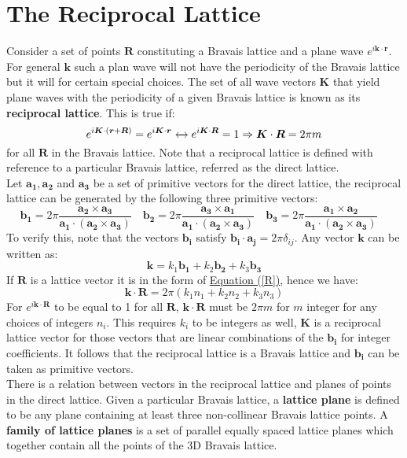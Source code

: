 \documentclass[10.75pt,a4paper,openright,bottom=2cm]{article}
\renewcommand{\Vec}[1]{\boldsymbol{#1}}
\begin{document}
\section{The Reciprocal Lattice}
Consider a set of points $\Vec{R}$ constituting a Bravais lattice and a plane wave $e^{i\Vec{k}\cdot\Vec{r}}$. For general $\Vec{k}$ such a plan wave will not have the periodicity of the Bravais lattice but it will for certain special choices. The set of all wave vectors $\Vec{K}$ that yield plane waves with the periodicity of a given Bravais lattice is known as its \textbf{reciprocal lattice}. This is true if:
\[
e^{i\Vec{K}\cdot(\Vec{r}+\Vec{R})}=e^{i\Vec{K}\cdot\Vec{r}}\xleftrightarrow{}e^{i\Vec{K}\cdot\Vec{R}}=1\Rightarrow\Vec{K}\cdot\Vec{R}=2\pi m
\]
for all $\Vec{R}$ in the Bravais lattice. Note that a reciprocal lattice is defined with reference to a particular Bravais lattice, referred as the direct lattice.\\
Let $\Vec{a_1},\Vec{a_2}$ and $\Vec{a_3}$ be a set of primitive vectors for the direct lattice, the reciprocal lattice can be generated by the following three primitive vectors:
\[
\Vec{b_1}=2\pi\frac{\Vec{a_2}\times\Vec{a_3}}{\Vec{a_1}\cdot(\Vec{a_2}\times\Vec{a_3})} \quad
\Vec{b_2}=2\pi\frac{\Vec{a_3}\times\Vec{a_1}}{\Vec{a_1}\cdot(\Vec{a_2}\times\Vec{a_3})}\quad
\Vec{b_3}=2\pi\frac{\Vec{a_1}\times\Vec{a_2}}{\Vec{a_1}\cdot(\Vec{a_2}\times\Vec{a_3})}\quad
\]
To verify this, note that the vectors $\Vec{b_i}$ satisfy $\Vec{b_i}\cdot\Vec{a_j}=2\pi\delta_{ij}$. Any vector $\Vec{k}$ can be written as:
\[
\Vec{k}=k_1\Vec{b_1}+k_2\Vec{b_2}+k_3\Vec{b_3}
\]
If $\Vec{R}$ is a lattice vector it is in the form of \hyperref[R]{Equation (\ref{R})}, hence we have:
\[
\Vec{k}\cdot\Vec{R}=2\pi(k_1n_1+k_2n_2+k_3n_3)
\]
For $e^{i\Vec{k}\cdot\Vec{R}}$ to be equal to 1 for all $\Vec{R}$, $\Vec{k}\cdot\Vec{R}$ must be $2\pi m$ for $m$ integer for any choices of integers $n_i$. This requires $k_i$ to be integers as well, $\Vec{K}$ is a reciprocal lattice vector for those vectors that are linear combinations of the $\Vec{b_i}$ for integer coefficients. It follows that the reciprocal lattice is a Bravais lattice and $\Vec{b_i}$ can be taken as primitive vectors.\\
There is a relation between vectors in the reciprocal lattice and planes of points in the direct lattice. Given a particular Bravais lattice, a \textbf{lattice plane} is defined to be any plane containing at least three non-collinear Bravais lattice points. A \textbf{family of lattice planes} is a set of parallel equally spaced lattice planes which together contain all the points of the 3D Bravais lattice.\\
\end{document}
